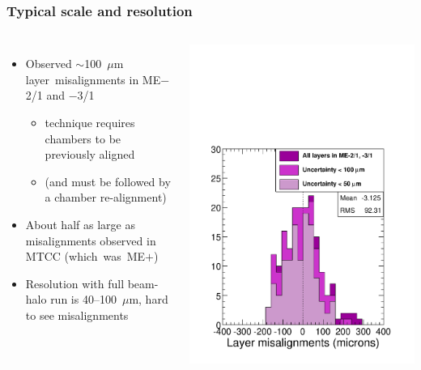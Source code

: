 \documentclass[compress]{beamer}
\begin{document}
\begin{frame}
\frametitle{Typical scale and resolution}

\vspace{0.1 cm}
\begin{columns}
\begin{itemize}
\item Observed $\sim$100~$\mu$m \mbox{layer misalignments\hspace{-0.25 cm}} in ME$-$2/1 and $-$3/1
\begin{itemize}
\item technique requires chambers to be previously aligned
\item (and must be followed by a chamber re-alignment)
\end{itemize}
\item About half as large as misalignments observed in MTCC
  \mbox{(which was ME$+$)\hspace{-1 cm}}
\item Resolution with full beam-halo run is 40--100~$\mu$m, hard to see misalignments
\end{itemize}

\includegraphics[width=\linewidth]{layer_hist.pdf}
\end{columns}


\end{frame}
\end{document}
